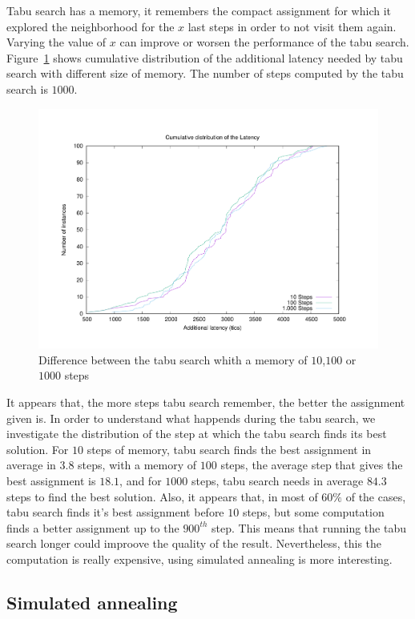 \documentclass[english]{article}
\begin{document}
Tabu search has a memory, it remembers the compact assignment for which it explored the neighborhood for the $x$ last steps in order to not visit them again. Varying the value of $x$ can improve or worsen the performance of the tabu search.
Figure~\ref{fig:tabudistrib} shows cumulative distribution of the additional latency needed by tabu search with different size of memory. The number of steps computed by the tabu search is $1000$.
\begin{figure}[h]
	\centering
	\includegraphics[scale=0.3]{taboo_distrib}
\caption{ Difference between the tabu search whith a memory of $10$,$100$ or $1000$ steps}
\label{fig:tabudistrib}
\end{figure}
It appears that, the more steps tabu search remember, the better the assignment given is.
In order to understand what happends during the tabu search, we investigate the distribution of the step at which the tabu search finds its best solution.
For $10$ steps of memory, tabu search finds the best assignment in average in $3.8$ steps, with a memory of $100$ steps, the average step that gives the best assignment is $18.1$, and for $1000$ steps, tabu search needs in average $84.3$ steps to find the best solution. 
Also, it appears that, in most of $60\%$ of the cases, tabu search finds it's best assignment before $10$ steps, but some computation finds a better assignment up to the $900^{th}$ step. This means that running the tabu search longer could improove the quality of the result. Nevertheless, this the computation is really expensive, using simulated annealing is more interesting.

\subsection{Simulated annealing}
\end{document}
